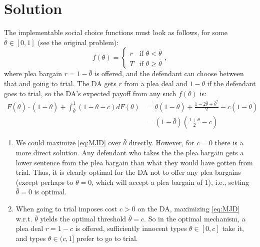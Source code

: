 \documentclass[a4paper]{article}
\begin{document}
\section*{Solution}
	The implementable social choice functions must look as follows, for some $\bar{\theta} \in [0,1]$ (see the original problem):
	\[ f(\theta)= \begin{cases} r & \text{if } \theta<\bar{\theta} \\
		T & \text{if } \theta\geq\bar{\theta} \end{cases}, \]
	where plea bargain $r= 1-\bar{\theta}$ is offered, and the defendant can choose between that and going to trial. 
	The DA gets $r$ from a plea deal and $1-\theta$ if the defendant goes to trial, so the DA's expected payoff from any such $f(\theta)$ is:
	\begin{equation}
		\label{eq:MJD}
		\begin{aligned}
			F(\bar{\theta}) \cdot (1-\bar{\theta})+\int_{\bar{\theta}}^1 (1-\theta-c) dF(\theta)
			&= \bar{\theta} (1-\bar{\theta}) + \frac{1-2\bar{\theta}+\bar{\theta}^2}{2} - c(1-\bar{\theta}) 
			\\&= (1-\bar{\theta}) \left(\frac{1+\bar{\theta}}{2} - c\right)
		\end{aligned}
	\end{equation}
	\begin{enumerate}
		\item We could maximize \eqref{eq:MJD} over $\bar{\theta}$ directly. However, for $c=0$ there is a more direct solution. Any defendant who takes the the plea bargain gets a lower sentence from the plea bargain than what they would have gotten from trial. Thus, it is clearly optimal for the DA not to offer any plea bargains (except perhaps to $\theta=0$, which will accept a plea bargain of 1), i.e., setting $\bar{\theta}=0$ is optimal.
		
		\item When going to trial imposes cost $c>0$ on the DA, maximizing \eqref{eq:MJD} w.r.t. $\bar{\theta}$ yields the optimal threshold $\bar{\theta}=c$. So in the optimal mechanism, a plea deal $r=1-c$ is offered, sufficiently innocent types $\theta \in [0,c]$ take it, and types $\theta \in (c,1]$ prefer to go to trial.
	\end{enumerate}
\fi
\end{document}
